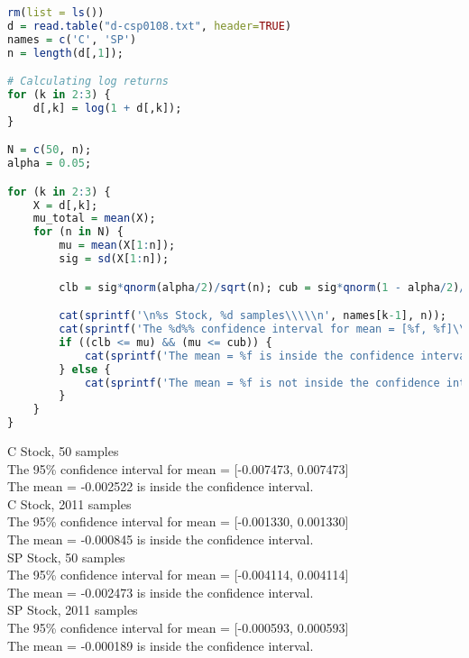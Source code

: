 \documentclass{article}
\begin{document}
\begin{lstlisting}[language=R]
rm(list = ls())
d = read.table("d-csp0108.txt", header=TRUE)
names = c('C', 'SP')
n = length(d[,1]);

# Calculating log returns
for (k in 2:3) {
	d[,k] = log(1 + d[,k]);
}

N = c(50, n);
alpha = 0.05;

for (k in 2:3) {
	X = d[,k];
	mu_total = mean(X);
	for (n in N) {
		mu = mean(X[1:n]);
		sig = sd(X[1:n]);

		clb = sig*qnorm(alpha/2)/sqrt(n); cub = sig*qnorm(1 - alpha/2)/sqrt(n);

		cat(sprintf('\n%s Stock, %d samples\\\\\n', names[k-1], n));
		cat(sprintf('The %d%% confidence interval for mean = [%f, %f]\\\\\n', 100*(1-alpha), clb, cub));
		if ((clb <= mu) && (mu <= cub)) {
			cat(sprintf('The mean = %f is inside the confidence interval.\\\\\n\n', mu));
		} else {
			cat(sprintf('The mean = %f is not inside the confidence interval.\\\\\n\n', mu));
		}
	}	
}

\end{lstlisting}

C Stock, 50 samples\\
The 95\% confidence interval for mean = [-0.007473, 0.007473]\\
The mean = -0.002522 is inside the confidence interval.\\


C Stock, 2011 samples\\
The 95\% confidence interval for mean = [-0.001330, 0.001330]\\
The mean = -0.000845 is inside the confidence interval.\\


SP Stock, 50 samples\\
The 95\% confidence interval for mean = [-0.004114, 0.004114]\\
The mean = -0.002473 is inside the confidence interval.\\


SP Stock, 2011 samples\\
The 95\% confidence interval for mean = [-0.000593, 0.000593]\\
The mean = -0.000189 is inside the confidence interval.\\
\end{document}
